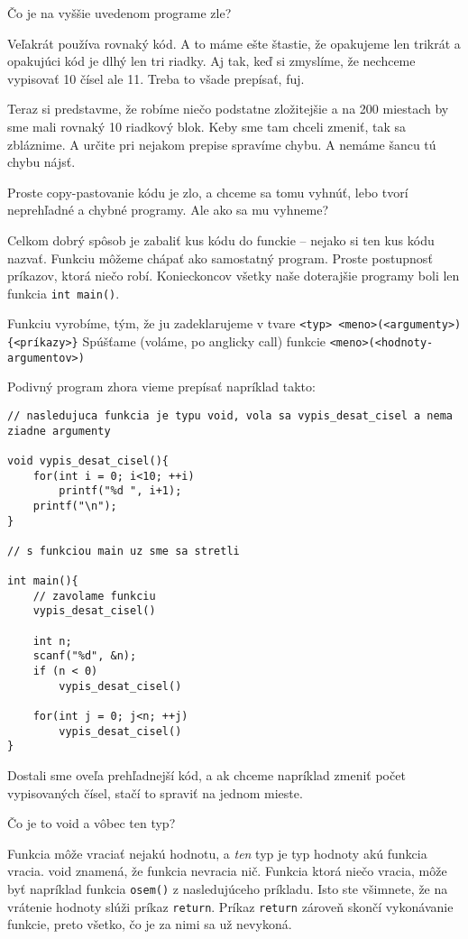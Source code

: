 Čo je na vyššie uvedenom programe zle?

Veľakrát používa rovnaký kód. A to máme ešte štastie, že opakujeme len trikrát 
a opakujúci kód je dlhý len tri riadky. Aj tak, keď si zmyslíme, že nechceme vypisovať 10 čísel
ale 11. Treba to všade prepísať, fuj.

Teraz si predstavme, že robíme niečo podstatne zložitejšie a 
na 200 miestach by sme mali rovnaký 10 riadkový blok. Keby sme tam chceli zmeniť, tak sa zbláznime.
A určite pri nejakom prepise spravíme chybu. A nemáme šancu tú chybu nájsť.

Proste copy-pastovanie kódu je zlo, a chceme sa tomu vyhnúť, 
lebo tvorí neprehľadné a chybné programy. Ale ako sa mu vyhneme?

\medskip

Celkom dobrý spôsob je zabaliť kus kódu do funckie -- nejako si ten kus kódu nazvať.
Funkciu môžeme chápať ako samostatný program. Proste postupnosť príkazov, ktorá niečo robí.
Konieckoncov všetky naše doterajšie programy boli len funkcia \verb!int main()!.

Funkciu vyrobíme, tým, že ju zadeklarujeme v tvare \verb!<typ> <meno>(<argumenty>){<príkazy>}!
Spúšťame (voláme, po anglicky call) funkcie \verb!<meno>(<hodnoty-argumentov>)!

Podivný program zhora vieme prepísať napríklad takto:

\begin{lstlisting}
// nasledujuca funkcia je typu void, vola sa vypis_desat_cisel a nema ziadne argumenty

void vypis_desat_cisel(){
    for(int i = 0; i<10; ++i)
        printf("%d ", i+1);
    printf("\n"); 
}

// s funkciou main uz sme sa stretli

int main(){
    // zavolame funkciu
    vypis_desat_cisel()
    
    int n;
    scanf("%d", &n);
    if (n < 0)
        vypis_desat_cisel()

    for(int j = 0; j<n; ++j) 
        vypis_desat_cisel()
}
\end{lstlisting}

Dostali sme oveľa prehľadnejší kód, a ak chceme napríklad zmeniť počet vypisovaných čísel,
stačí to spraviť na jednom mieste.

\medskip 

Čo je to void a vôbec ten typ?

Funkcia môže vraciať nejakú hodnotu, a \textit{ten} typ je typ hodnoty akú funkcia vracia.
void znamená, že funkcia nevracia nič. Funkcia ktorá niečo vracia, môže byť 
napríklad funkcia \verb!osem()! z nasledujúceho príkladu. Isto ste všimnete, že
na vrátenie hodnoty slúži príkaz \verb!return!. Príkaz \verb!return! zároveň skončí
vykonávanie funkcie, preto všetko, čo je za nimi sa už nevykoná. 

